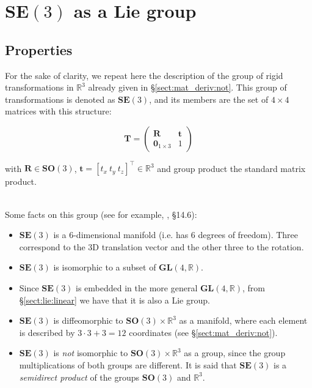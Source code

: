 \documentclass[a4paper,11pt]{report}
\begin{document}
\chapter{$\mathbf{SE}(3)$ as a Lie group}
\label{chap:se3_lie}

\section{Properties}

For the sake of clarity, we repeat here the description of
the group of rigid transformations in $\mathbb{R}^3$ already given
in \S\ref{sect:mat_deriv:not}.
This group of transformations is denoted as $\mathbf{SE}(3)$,
and its members are the set of $4 \times 4$ matrices with this structure:

\begin{equation}
\label{eq:T_Rt_bis}
 \mathbf{T} =
\left(
\begin{array}{c|c}
  \mathbf{R} & \mathbf{t} \\
\hline
  \mathbf{0}_{1\times 3} & 1
\end{array}
\right)
\end{equation}

\noindent with $\mathbf{R} \in \mathbf{SO}(3)$,
$\mathbf{t}=[t_x ~ t_y ~ t_z]^\top \in \mathbb{R}^3$
and group product the standard matrix product.

~\\

Some facts on this group (see for example, \cite{gallier2001geometric}, \S14.6):

\begin{itemize}
 \item $\mathbf{SE}(3)$ is a 6-dimensional manifold (i.e. has 6 degrees of freedom). Three correspond to the 3D translation vector and the other three to the rotation.
 \item  $\mathbf{SE}(3)$ is isomorphic to a subset of $\mathbf{GL}(4,\mathbb{R})$.
 \item Since $\mathbf{SE}(3)$ is embedded in the more general $\mathbf{GL}(4,\mathbb{R})$,
         from \S\ref{sect:lie:linear} we have that it is also a Lie group.
 \item  $\mathbf{SE}(3)$ is diffeomorphic to $\mathbf{SO}(3) \times \mathbb{R}^3$ as a manifold,
  where each element is described by $3\cdot 3+3=12$ coordinates (see \S\ref{sect:mat_deriv:not}).
 \item  $\mathbf{SE}(3)$ is \emph{not} isomorphic to $\mathbf{SO}(3) \times \mathbb{R}^3$ as a group,
since the group multiplications of both groups are different.
It is said that $\mathbf{SE}(3)$ is a \emph{semidirect product} of
the groups $\mathbf{SO}(3)$ and $\mathbb{R}^3$.
\end{itemize}
\end{document}
